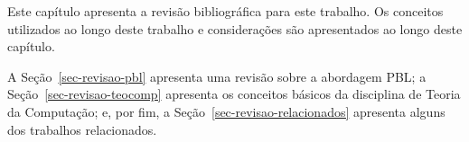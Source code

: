 \label{cap-revisao}
\acresetall

Este capítulo apresenta a revisão bibliográfica para este trabalho.
Os conceitos utilizados ao longo deste trabalho e considerações
são apresentados ao longo deste capítulo.

A Seção~\ref{sec-revisao-pbl} apresenta uma revisão sobre a abordagem \ac{PBL};
a Seção~\ref{sec-revisao-teocomp} apresenta os conceitos básicos da disciplina
de Teoria da Computação;
e, por fim, a Seção~\ref{sec-revisao-relacionados} apresenta alguns dos trabalhos
relacionados.




